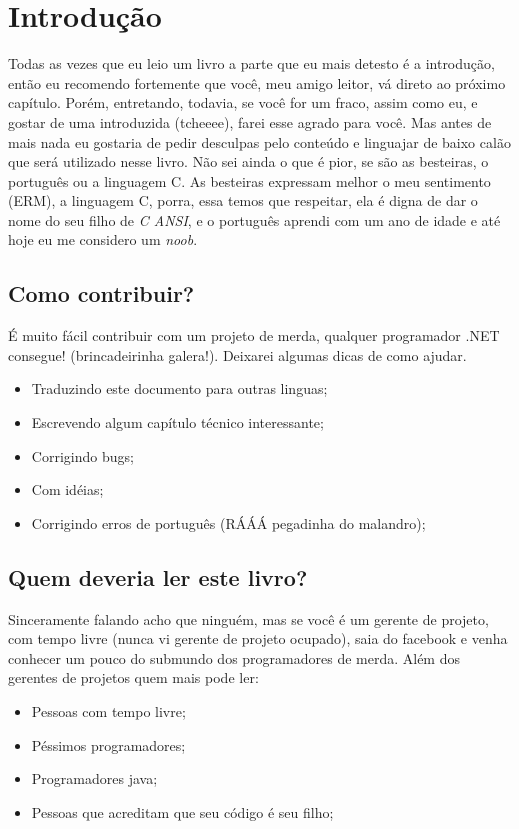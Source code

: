 

\chapter{Introdução}

Todas as vezes que eu leio um livro a parte que eu mais detesto é a introdução, então eu recomendo fortemente que você, meu amigo 
leitor, vá direto ao próximo capítulo. Porém, entretando, todavia, se você for um fraco, assim como eu, e gostar de uma introduzida 
(tcheeee), farei esse agrado para você. Mas antes de mais nada eu gostaria de pedir desculpas pelo conteúdo e linguajar de baixo 
calão que será utilizado nesse livro. Não sei ainda o que é pior, se são as besteiras, o português ou a linguagem C. As besteiras 
expressam melhor o meu sentimento (ERM), a linguagem C, porra, essa temos que respeitar, ela é digna de dar o nome do seu filho de 
\textit{C ANSI}, e o português aprendi com um ano de idade e até hoje eu me considero um \textit{noob}.


\section{Como contribuir?}

É muito fácil contribuir com um projeto de merda, qualquer programador .NET consegue! (brincadeirinha galera!). 
Deixarei algumas dicas de como ajudar.
\vspace{5 mm}
\begin{itemize}
 \item Traduzindo este documento para outras linguas;
 \item Escrevendo algum capítulo técnico interessante;
 \item Corrigindo bugs;
 \item Com idéias;
 \item Corrigindo erros de português (RÁÁÁ pegadinha do malandro);
\end{itemize}

\section{Quem deveria ler este livro?}

Sinceramente falando acho que ninguém, mas se você é um gerente de projeto, com tempo livre (nunca vi gerente de projeto ocupado), 
saia do facebook e venha conhecer um pouco do submundo dos programadores de merda. Além dos gerentes de projetos quem mais pode ler:
\vspace{5 mm}
\begin{itemize}
  \item Pessoas com tempo livre;
  \item Péssimos programadores;
  \item Programadores java;
  \item Pessoas que acreditam que seu código é seu filho;
\end{itemize}

